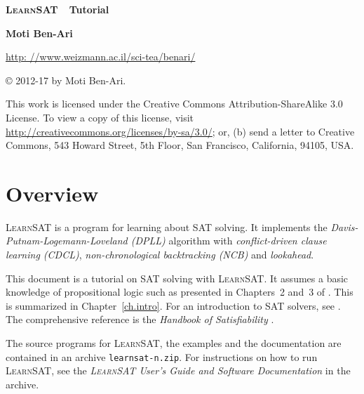 \documentclass[11pt]{report}
\newcommand*{\p}[1]{\textup{\texttt{#1}}}
\newcommand*{\ls}{\textsc{LearnSAT}}
\begin{document}
\thispagestyle{empty}

\begin{center}

\textbf{\huge \ls{}\ \ Tutorial}

\bigskip
\bigskip

\textbf{\LARGE Moti Ben-Ari}

\bigskip
\bigskip

\large\url{http: //www.weizmann.ac.il/sci-tea/benari/}

\bigskip



\end{center}

\vspace*{\fill}

\begin{center}
\copyright{} 2012-17 by Moti Ben-Ari.
\end{center}
This work is licensed under the Creative Commons Attribution-ShareAlike 3.0
License. To view a copy of this license, visit
\url{http://creativecommons.org/licenses/by-sa/3.0/}; or, (b) send a letter
to Creative Commons, 543 Howard Street, 5th Floor, San Francisco,
California, 94105, USA.

\newpage

\tableofcontents
\clearpage


\chapter{Overview}

\ls{} is a program for learning about SAT solving. It implements the \emph{Davis-Putnam-Logemann-Loveland (DPLL)} algorithm with \emph{conflict-driven clause learning (CDCL)}, \emph{non-\-chro\-no\-log\-i\-cal backtracking (NCB)} and \emph{lookahead}.

This document is a tutorial on SAT solving with \ls{}. It assumes a basic knowledge of propositional logic such as presented in Chapters~2 and~3 of \cite{mlcs}. This is summarized in Chapter~\ref{ch.intro}. For an introduction to SAT solvers, see \cite[Chapter~6]{mlcs}. The comprehensive reference is the \emph{Handbook of Satisfiability} \cite{SAT}. 

The source programs for \ls{}, the examples and the documentation are contained in an archive \p{learnsat-n.zip}. For instructions on how to run \ls{}, see the \emph{\ls{} User's Guide and Software Documentation} in the archive.
\end{document}
